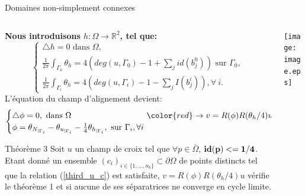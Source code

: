 \begin{frame}{Domaines non-simplement connexes}
\vspace{-0.35cm}
\begin{columns}
\hspace{-0.25cm}
\begin{column}{0.68\textwidth}
\footnotesize
{\bf Nous introduisons $h:\Omega\longrightarrow\mathbb{R}^2$, %
tel que:}
\vspace{-0.15cm}
\begin{equation*}
\begin{cases}
    \triangle h = 0 \mbox{ dans }\Omega,\\
    \displaystyle\frac{1}{2\pi}\int_{\Gamma_0}\theta_h = 4(deg(u, \Gamma_0)-1+\sum_j id(b_j^0))\mbox{ sur } \Gamma_0,\\[0.25cm]
    \displaystyle\frac{1}{2\pi}\int_{\Gamma_i}\theta_h = 4(deg(u, \Gamma_i)-1-\sum_j I(b_j^i)), \forall~i.
\end{cases}
\end{equation*}
\vspace{-0.18cm}
{L'équation du champ d'alignement devient:}
{\color{onera}
\begin{equation*}
\begin{cases}
    \triangle\phi = 0, \mbox{ dans }\Omega\hspace{3.2cm}{\color{red}\rightarrow v=R(\phi)R(\theta_h/4)u}\\
    \phi = \theta_{N_{|\Gamma_i}}-\theta_{u_{|\Gamma_i}}-\frac{1}{4}\theta_{h_{|\Gamma_i}}, \mbox{ sur }\Gamma_i, \forall i
\end{cases}
\end{equation*}
}
\vspace{-0.15cm}
\begin{onerablock}{Théorème 3}
 Soit $u$ un champ de croix tel que $\forall p\in\bar{\Omega}$, ${\bf id(p)<=1/4}$. Etant donné un ensemble $(c_i)_{i\in\{1,\dots,n_b\}}\subset\partial\Omega$ de points distincts tel que la relation (\ref{third_u_c}) est satisfaite, $v=R(\phi)R(\theta_h/4)u$  vérifie le théorème 1 et si aucune de ses séparatrices ne converge en cycle limite.
\end{onerablock}
\end{column}
\begin{column}{0.32\textwidth}
\centering
\texttt{[image: image.eps]}
\end{column}
\end{columns}
\end{frame}

